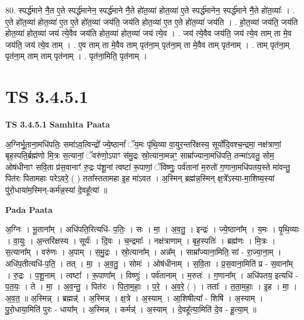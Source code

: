 \documentclass[17pt]{extarticle}
\begin{document}
80. स्पर्द्ध॑माने नै॒त ए॒ते स्पर्द्ध॑मानेन॒ स्पर्द्ध॑माने नै॒ते हो॑त॒व्या॑ होत॒व्या॑ ए॒ते स्पर्द्ध॑मानेन॒ स्पर्द्ध॑माने नै॒ते हो॑त॒व्याः᳚ । . ए॒ते हो॑त॒व्या॑ होत॒व्या॑ ए॒त ए॒ते हो॑त॒व्या॑ जय॑ति॒ जय॑ति होत॒व्या॑ ए॒त ए॒ते हो॑त॒व्या॑ जय॑ति । . हो॒त॒व्या॑ जय॑ति॒ जय॑ति होत॒व्या॑ होत॒व्या॑ जय॑ त्ये॒वैव जय॑ति होत॒व्या॑ होत॒व्या॑ जय॑ त्ये॒व । . जय॑ त्ये॒वैव जय॑ति॒ जय॑ त्ये॒व ताम् ता मे॒व जय॑ति॒ जय॑ त्ये॒व ताम् । . ए॒व ताम् ता मे॒वैव ताम् पृत॑ना॒म् पृत॑ना॒म् ता मे॒वैव ताम् पृत॑नाम् । . ताम् पृत॑ना॒म् पृत॑ना॒म् ताम् ताम् पृत॑नाम् । . पृत॑ना॒मिति॒ पृत॑नाम् । \newline
\pagebreak
{}

\section{ TS 3.4.5.1 }

\textbf{TS 3.4.5.1 } \newline
\textbf{Samhita Paata} \newline

अ॒ग्निर्भू॒ताना॒मधि॑पतिः॒ समा॑ऽव॒त्विन्द्रो᳚ ज्ये॒ष्ठानां᳚ ॅय॒मः पृ॑थि॒व्या वा॒युर॒न्तरि॑क्षस्य॒ सूर्यो॑दि॒वश्च॒न्द्रमा॒ नक्ष॑त्राणां॒ बृह॒स्पति॒र्ब्रह्म॑णो मि॒त्रः स॒त्यानां॒ ॅवरु॑णो॒ऽपाꣳ स॑मु॒द्रः स्रो॒त्याना॒मन्नꣳ॒॒ साम्रा᳚ज्याना॒मधि॑पति॒ तन्मा॑ऽवतु॒ सोम॒ ओष॑धीनाꣳ सवि॒ता प्र॑स॒वानाꣳ॑ रु॒द्रः प॑शू॒नां त्वष्टा॑ रू॒पाणां॒ ॅविष्णुः॒ पर्व॑तानां म॒रुतो॑ ग॒णाना॒मधि॑पतय॒स्ते मा॑वन्तु॒ पित॑रः पितामहाः परेऽवरे॒ ( ) तता᳚स्ततामहा इ॒ह मा॑ऽवत । अ॒स्मिन् ब्रह्म॑न्न॒स्मिन् क्ष॒त्रे᳚ऽस्या-मा॒शिष्य॒स्यां पु॑रो॒धाया॑म॒स्मिन्-कर्म॑न्न॒स्यां दे॒वहू᳚त्यां ॥ \newline

\textbf{Pada Paata} \newline

अ॒ग्निः । भू॒ताना᳚म् । अधि॑पति॒रित्यधि॑- प॒तिः॒ । सः । मा॒ । अ॒व॒तु॒ । इन्द्रः॑ । ज्ये॒ष्ठाना᳚म् । य॒मः । पृ॒थि॒व्याः । वा॒युः । अ॒न्तरि॑क्षस्य । सूर्यः॑ । दि॒वः । च॒न्द्रमाः᳚ । नक्ष॑त्राणाम् । बृह॒स्पतिः॑ । ब्रह्म॑णः । मि॒त्रः । स॒त्याना᳚म् । वरु॑णः । अ॒पाम् । स॒मु॒द्रः । स्रो॒त्याना᳚म् । अन्न᳚म् । साम्रा᳚ज्याना॒मिति॒ सां - रा॒ज्या॒ना॒म् । अधि॑प॒तीत्यधि॑-प॒ति॒ । तत् । मा॒ । अ॒व॒तु॒ । सोमः॑ । ओष॑धीनाम् । स॒वि॒ता । प्र॒स॒वाना॒मिति॑ प्र - स॒वाना᳚म् । रु॒द्रः । प॒शू॒नाम् । त्वष्टा᳚ । रू॒पाणा᳚म् । विष्णुः॑ । पर्व॑तानाम् । म॒रुतः॑ । ग॒णाना᳚म् । अधि॑पतय॒ इत्यधि॑ - प॒त॒यः॒ । ते । मा॒ । अ॒व॒न्तु॒ । पित॑रः । पि॒ता॒म॒हाः॒ । प॒रे॒ । अ॒व॒रे॒ ( ) । तताः᳚ । त॒ता॒म॒हाः॒ । इ॒ह । मा॒ । अ॒व॒त॒ ॥ अ॒स्मिन्न् । ब्रह्मन्न्॑ । अ॒स्मिन्न् । क्ष॒त्रे । अ॒स्याम् । आ॒शिषीत्या᳚ - शिषि॑ । अ॒स्याम् । पु॒रो॒धाया॒मिति॑ पुरः - धाया᳚म् । अ॒स्मिन्न् । कर्मन्न्॑ । अ॒स्याम् । दे॒वहू᳚त्या॒मिति॑ दे॒व - हू॒त्या॒म् ॥  \newline
\end{document}
